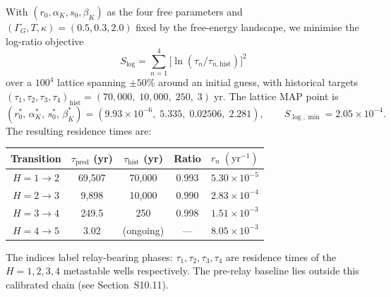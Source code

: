 \documentclass[11pt]{article}
\begin{document}
With $(r_0,\alpha_K,s_0,\beta_K)$ as the four free parameters and
$(\Gamma_G,T,\kappa)=(0.5,0.3,2.0)$ fixed by the free-energy
landscape, we minimise the log-ratio objective
\[
S_{\log}
= \sum_{n=1}^{4}\bigl[\ln(\tau_n/\tau_{n,\mathrm{hist}})\bigr]^2
\]
over a $100^4$ lattice spanning $\pm 50\%$ around an initial guess,
with historical targets $(\tau_1,\tau_2,\tau_3,\tau_4)_{\mathrm{hist}}=(70{,}000,\;10{,}000,\;250,\;3)\;\mathrm{yr}$.
The lattice MAP point is
\[
(r_0^*,\,\alpha_K^*,\,s_0^*,\,\beta_K^*)
= (9.93\times 10^{-6},\;5.335,\;0.02506,\;2.281),
\qquad S_{\log,\min}=2.05\times 10^{-4}.\]
The resulting residence times are:

\begin{center}
\begin{tabular}{ccccc}
\toprule
Transition & $\tau_{\mathrm{pred}}$ (yr) & $\tau_{\mathrm{hist}}$ (yr) & Ratio & $r_n\;(\mathrm{yr}^{-1})$ \\
\midrule
$H=1\to 2$ & 69{,}507 & 70{,}000 & 0.993 & $5.30\times 10^{-5}$ \\
$H=2\to 3$ & 9{,}898 & 10{,}000 & 0.990 & $2.83\times 10^{-4}$ \\
$H=3\to 4$ & 249.5 & 250 & 0.998 & $1.51\times 10^{-3}$ \\
$H=4\to 5$ & 3.02 & (ongoing) & --- & $8.05\times 10^{-3}$ \\
\bottomrule
\end{tabular}
\end{center}

\noindent
The indices label relay-bearing phases: $\tau_1,\tau_2,\tau_3,\tau_4$
are residence times of the $H=1,2,3,4$ metastable wells respectively.
The pre-relay baseline lies outside this calibrated chain (see Section~S10.11).

\end{document}
